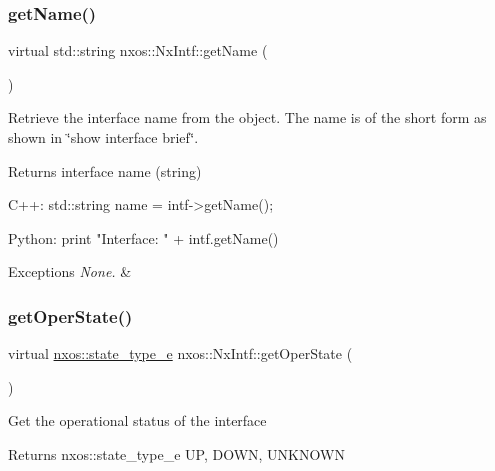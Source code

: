 \subsubsection{\texorpdfstring{get\+Name()}{getName()}}
{\footnotesize\ttfamily virtual std\+::string nxos\+::\+Nx\+Intf\+::get\+Name (\begin{DoxyParamCaption}{ }\end{DoxyParamCaption})\hspace{0.3cm}{\ttfamily [pure virtual]}}

Retrieve the interface name from the object. The name is of the short form as shown in \char`\"{}show interface brief\char`\"{}.

\begin{DoxyReturn}{Returns}
interface name (string)
\end{DoxyReturn}

\begin{DoxyCode}
C++:
       std::string name = intf->getName();

Python:
       print \textcolor{stringliteral}{"Interface: "} + intf.getName() 
\end{DoxyCode}



\begin{DoxyExceptions}{Exceptions}
{\em None.} & \\
\hline
\end{DoxyExceptions}
\mbox{\label{classnxos_1_1_nx_intf_abd5291d975d3193c3603efd7ec17deda}} 
\subsubsection{\texorpdfstring{get\+Oper\+State()}{getOperState()}}
{\footnotesize\ttfamily virtual \mbox{\hyperlink{nx__common_8h_a7c257059d03188765435b36e95dbb764}{nxos\+::state\+\_\+type\+\_\+e}} nxos\+::\+Nx\+Intf\+::get\+Oper\+State (\begin{DoxyParamCaption}{ }\end{DoxyParamCaption})\hspace{0.3cm}{\ttfamily [pure virtual]}}

Get the operational status of the interface

\begin{DoxyReturn}{Returns}
nxos\+::state\+\_\+type\+\_\+e UP, D\+O\+WN, U\+N\+K\+N\+O\+WN
\end{DoxyReturn}

